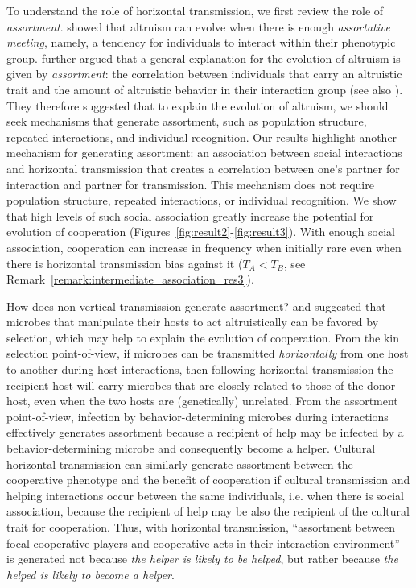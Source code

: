 \documentclass[12pt]{extarticle}
\begin{document}
To understand the role of horizontal transmission, we first review the role of \emph{assortment}.
\citet{Eshel1982} showed that altruism can evolve when there is enough \emph{assortative meeting}, namely, a tendency for individuals to interact within their phenotypic group.
\citet{Fletcher2009assortment}  further argued that a general explanation for the evolution of altruism is given by \emph{assortment}: the correlation between individuals that carry an altruistic trait and the amount of altruistic behavior in their interaction group (see also \citet{Bijma2010assortment}).
They therefore suggested that to explain the evolution of altruism, we should seek mechanisms that generate  assortment, such as population structure, repeated interactions, and individual recognition.
Our results highlight another mechanism for generating assortment: an association between social interactions and horizontal transmission that creates a correlation between one's partner for interaction and partner for transmission.
This mechanism does not require population structure, repeated interactions, or individual recognition.
We show that high levels of such social association greatly increase the potential for evolution of cooperation (Figures~\ref{fig:result2}-\ref{fig:result3}).
With enough social association, cooperation can increase in frequency when initially rare even when there is horizontal transmission bias against it ($T_A<T_B$, see Remark~\ref{remark:intermediate_association_res3}).

How does non-vertical transmission generate assortment? 
\citet{lewin2017microbes} and \citet{lewin2020rockpaperscissors} 
suggested that microbes that manipulate their hosts to act altruistically can be favored by selection, which may help to explain the evolution of cooperation. 
From the kin selection point-of-view, if microbes can be transmitted \emph{horizontally} from one host to another during host interactions, then following horizontal transmission the recipient host will carry microbes that are closely related to those of the donor host, 
even when the two hosts are (genetically) unrelated. 
From the assortment point-of-view,
infection by behavior-determining microbes during interactions effectively generates assortment because a recipient of help may be infected by a behavior-determining microbe and consequently become a helper.
Cultural horizontal transmission can similarly generate assortment between the cooperative phenotype and the benefit of cooperation if cultural transmission and helping interactions occur between the same individuals, i.e. when there is social association, because the recipient of help may be also the recipient of the cultural trait for cooperation. 
Thus, with horizontal transmission, ``assortment between focal cooperative players and cooperative acts in their interaction
environment''~\citep{Fletcher2009assortment} is generated not because \emph{the helper is likely to be helped}, but rather because \emph{the helped is likely to become a helper}.
\end{document}
